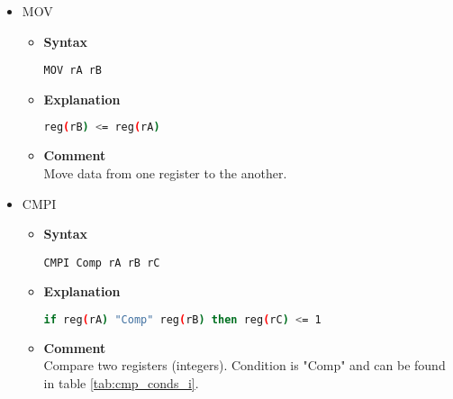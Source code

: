 \begin{itemize}
    \item MOV
    \begin{itemize}
        \item \textbf{Syntax}
        \begin{lstlisting}[language={[markII]Assembler}, frame=single]
    MOV rA rB
        \end{lstlisting}
        \item \textbf{Explanation}
        \begin{lstlisting}[language=bash, frame=single]
    reg(rB) <= reg(rA)
        \end{lstlisting}
        \item \textbf{Comment} \\
    Move data from one register to the another.
    \end{itemize}

    \item CMPI
    \begin{itemize}
        \item \textbf{Syntax}
        \begin{lstlisting}[language={[markII]Assembler}, frame=single]
    CMPI Comp rA rB rC
        \end{lstlisting}
        \item \textbf{Explanation}
        \begin{lstlisting}[language=bash, frame=single]
    if reg(rA) "Comp" reg(rB) then reg(rC) <= 1
        \end{lstlisting}
        \item \textbf{Comment} \\
    Compare two registers (integers). Condition is "Comp" and can be found in table \ref{tab:cmp_conds_i}.


\end{itemize}
\end{itemize}
